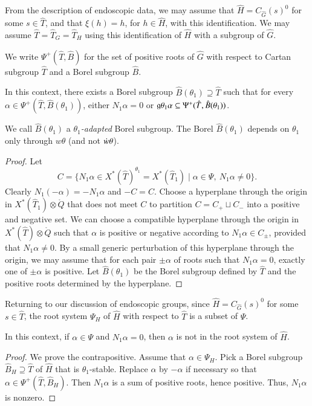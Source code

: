 From the description of endoscopic data, we may assume that $\hat H =
C_{\hat G}(s)^0$ for some $s\in \hat T$, and that $\xi(h) = h$, for $h
\in \hat H$, with this identification.  We may assume $\hat T = \hat
T_G = \hat T_H$ using this identification of $\hat H$ with a subgroup
of $\hat G$.

We write $\Psi^+(\hat T,\hat B)$ for the set of positive roots of
$\hat G$ with respect to Cartan subgroup $\hat T$ and a Borel subgroup
$\hat B$.

\begin{lemma} In this context, there exists a Borel subgroup
  $\hat B(\theta_1)\supseteq \hat T$ such that for every
  $\alpha\in\Psi^+(\hat T,\hat B(\theta_1))$, either $N_1\alpha = 0$
  or ${\mathfrak g}{\theta_1}\alpha\subseteq \Psi^+(\hat T,\hat B(\theta_1))$.
\end{lemma}

We call $\hat B(\theta_1)$ a {\it $\theta_1$-adapted} Borel subgroup.
The Borel $\hat B(\theta_1)$ depends on $\theta_1$ only through
$w\theta$ (and not $\dot w \theta$).

\begin{proof}  Let 
\[
C = \{N_1\alpha\in X^*(\hat T)^{\theta_1}=X^*(\hat T_1) \mid \alpha\in\Psi,\ N_1\alpha\ne 0\}.
\]
Clearly  $N_1(-\alpha)= - N_1\alpha$ and  $-C = C$.   Choose a hyperplane through the origin in $X^*(\hat T_1)\otimes\ring{Q}$
that does not meet $C$ to partition $C = C_+ \sqcup C_-$ into a positive and negative set.
We can choose a compatible hyperplane through the origin in $X^*(\hat T)\otimes\ring{Q}$
such that $\alpha$ is positive or negative according to $N_1\alpha\in C_\pm$, provided
that $N_1\alpha\ne 0$.  By a small generic perturbation of this hyperplane through the origin,
we may assume that for each pair $\pm\alpha$ of roots such that $N_1\alpha=0$,
exactly one of $\pm\alpha$ is positive.  Let $\hat B(\theta_1)$ be the Borel
subgroup defined by $\hat T$ and the positive roots determined by the hyperplane.
\end{proof}

Returning to our discussion of endoscopic groups,
since $\hat H = C_{\hat G}(s)^0$ for some $s\in \hat T$, the root system $\Psi_H$
of $\hat H$
with respect to $\hat T$ is a subset of $\Psi$.

\begin{lemma} In this context,  if $\alpha\in \Psi$ and  $N_1\alpha=0$, then
$\alpha$ is not in the root system of $\hat H$.
\end{lemma}

\begin{proof} We prove the contrapositive.  Assume that $\alpha\in\Psi_H$.
Pick a Borel subgroup $\hat B_H\supseteq \hat T$ of $\hat H$ that
is $\theta_1$-stable.  Replace $\alpha$ by $-\alpha$ if necessary so that 
$\alpha\in\Psi^+(\hat T,\hat B_H)$.  Then $N_1\alpha$ is a sum of positive roots,
hence positive.  Thus, $N_1\alpha$ is nonzero.
\end{proof}

